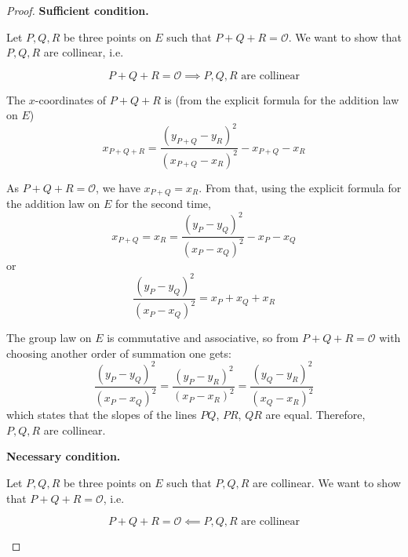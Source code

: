 \documentclass[12pt]{article}
\begin{document}
\begin{proof}


\item{\textbf{Sufficient condition.}}


Let $P, Q, R$ be three points on $E$ such that $P + Q + R = \mathcal{O}$. We want to show that $P, Q, R$ are collinear, i.e.

\begin{tcolorbox}[colframe=blue, colback=gray!10]
\begin{equation*}
    P + Q + R = \mathcal{O} \implies P, Q, R \text{ are  collinear}
\end{equation*}
\end{tcolorbox}

The $x$-coordinates of $P + Q + R$ is (from the explicit formula for the addition law on ${E}$)
\begin{equation*}
    x_{P+Q+R} = \frac{(y_{P+Q}-y_R)^2}{(x_{P+Q}-x_R)^2} - x_{P+Q} - x_R
\end{equation*}

As $P + Q + R = \mathcal{O}$, we have $x_{P+Q} = x_R$. From that, using the explicit formula for the addition law on ${E}$
for the second time,
\begin{equation*}
    x_{P+Q} = x_R = \frac{(y_P-y_Q)^2}{(x_P-x_Q)^2} - x_P -x_Q
\end{equation*}
or
\begin{equation*}
    \frac{(y_P-y_Q)^2}{(x_P-x_Q)^2} = x_P + x_Q + x_R
\end{equation*}

The group law on ${E}$ is commutative and associative, so from $P + Q + R = \mathcal{O}$ with choosing another
order of summation one gets:
\begin{equation*}
    \frac{(y_P-y_Q)^2}{(x_P-x_Q)^2} = \frac{(y_P-y_R)^2}{(x_P-x_R)^2} = \frac{(y_Q-y_R)^2}{(x_Q-x_R)^2}
\end{equation*}
which states that the slopes of the lines $PQ$, $PR$, $QR$ are equal. Therefore, $P, Q, R$ are collinear.


\item{\textbf{Necessary condition.}}


Let $P, Q, R$ be three points on ${E}$ such that $P, Q, R$ are collinear. We want to show that $P + Q + R = \mathcal{O}$, i.e.

\begin{tcolorbox}[colframe=blue, colback=gray!10]
    \begin{equation*}
        P + Q + R = \mathcal{O} \impliedby P, Q, R \text{ are  collinear}
    \end{equation*}
\end{tcolorbox}


\end{proof}
\end{document}
